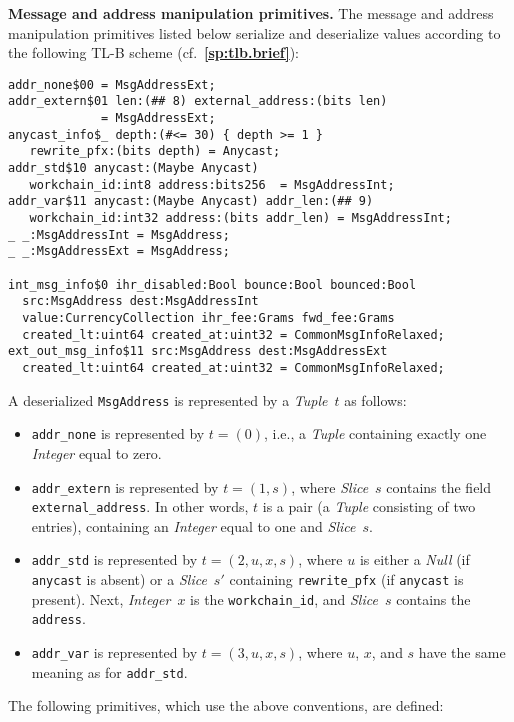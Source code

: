 \documentclass[12pt,oneside]{article}
\def\makepoint#1{\medbreak\noindent{\bf #1.\ }}
\def\nxsubpoint{\refstepcounter{subsubsection}%
  \smallbreak\makepoint{\thesubsubsection}}
\def\refpoint#1{{\rm\textbf{\ref{#1}}}}
\let\ptref=\refpoint
\def\emb#1{\textbf{#1.}}
\begin{document}
\nxsubpoint\emb{Message and address manipulation primitives}
The message and address manipulation primitives listed below serialize and deserialize values according to the following TL-B scheme (cf.~\ptref{sp:tlb.brief}):
\begin{verbatim}
addr_none$00 = MsgAddressExt;
addr_extern$01 len:(## 8) external_address:(bits len) 
             = MsgAddressExt;
anycast_info$_ depth:(#<= 30) { depth >= 1 }
   rewrite_pfx:(bits depth) = Anycast;
addr_std$10 anycast:(Maybe Anycast) 
   workchain_id:int8 address:bits256  = MsgAddressInt;
addr_var$11 anycast:(Maybe Anycast) addr_len:(## 9) 
   workchain_id:int32 address:(bits addr_len) = MsgAddressInt;
_ _:MsgAddressInt = MsgAddress;
_ _:MsgAddressExt = MsgAddress;

int_msg_info$0 ihr_disabled:Bool bounce:Bool bounced:Bool
  src:MsgAddress dest:MsgAddressInt 
  value:CurrencyCollection ihr_fee:Grams fwd_fee:Grams
  created_lt:uint64 created_at:uint32 = CommonMsgInfoRelaxed;
ext_out_msg_info$11 src:MsgAddress dest:MsgAddressExt
  created_lt:uint64 created_at:uint32 = CommonMsgInfoRelaxed;
\end{verbatim}
A deserialized {\tt MsgAddress} is represented by a {\em Tuple\/}~$t$ as follows:
\begin{itemize}
\item {\tt addr\_none} is represented by $t=(0)$, i.e., a {\em Tuple\/} containing exactly one {\em Integer\/} equal to zero.
\item {\tt addr\_extern} is represented by $t=(1,s)$, where {\em Slice\/}~$s$ contains the field {\tt external\_address}. In other words, $t$ is a pair (a {\em Tuple\/} consisting of two entries), containing an {\em Integer\/} equal to one and {\em Slice}~$s$.
\item {\tt addr\_std} is represented by $t=(2,u,x,s)$, where $u$ is either a {\em Null\/} (if {\tt anycast} is absent) or a {\em Slice\/}~$s'$ containing {\tt rewrite\_pfx} (if {\tt anycast} is present). Next, {\em Integer\/}~$x$ is the {\tt workchain\_id}, and {\em Slice\/}~$s$ contains the {\tt address}.
\item {\tt addr\_var} is represented by $t=(3,u,x,s)$, where $u$, $x$, and $s$ have the same meaning as for {\tt addr\_std}.
\end{itemize}
The following primitives, which use the above conventions, are defined:
\end{document}
